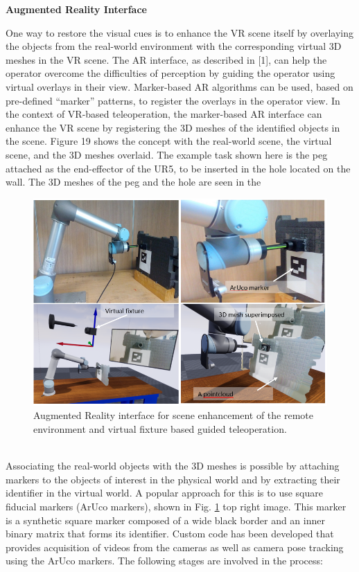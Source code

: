 \textbf{Augmented Reality Interface}

One way to restore the visual cues is to enhance the VR scene itself by overlaying the objects from the real-world environment with the corresponding virtual 3D meshes in the VR scene. The AR interface, as  described  in  [1],  can  help  the  operator  overcome  the  difficulties  of  perception  by  guiding  the  operator using virtual overlays in their view. Marker-based AR algorithms can be used, based on pre-defined “marker” patterns, to register the overlays in the operator view. In the context of VR-based teleoperation, the marker-based AR interface can enhance the VR scene by registering the 3D meshes of the identified objects in the scene. Figure 19 shows the concept with the real-world scene, the virtual scene,  and  the  3D  meshes  overlaid.  The  example  task  shown  here  is  the  peg  attached  as  the  end-effector of the UR5, to be inserted in the hole located on the wall. The 3D meshes of the peg and the hole are seen in the 


\begin{figure}[h]
    \centering
    \includegraphics[scale=0.5]{images/Aruco_AR.PNG}
    \caption{Augmented Reality  interface  for  scene enhancement of the remote environment and virtual fixture based guided teleoperation.}
    \label{fig:Aruco_AR}
\end{figure}\\


Associating the real-world objects with the 3D meshes is possible by attaching markers to the objects of  interest  in  the  physical  world  and  by  extracting  their  identifier  in  the virtual  world.  A  popular  approach  for  this  is  to  use  square  fiducial  markers  (ArUco  markers),  shown  in  Fig. \ref{fig:Aruco_AR} top right  image.  This  marker is a synthetic square marker composed of a wide black border and an inner binary matrix that forms its identifier. Custom code has been developed that provides acquisition of videos from the cameras as well as camera pose tracking using the ArUco markers. The following stages are involved in the process:

